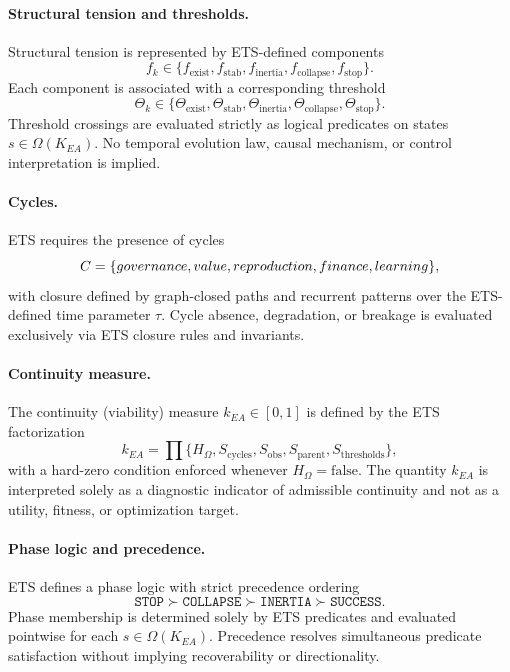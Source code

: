 \paragraph{Structural tension and thresholds.}
Structural tension is represented by ETS-defined components
\[
f_k \in \{f_{\text{exist}}, f_{\text{stab}}, f_{\text{inertia}},
          f_{\text{collapse}}, f_{\text{stop}}\}.
\]
Each component is associated with a corresponding threshold
\[
\Theta_k \in \{\Theta_{\text{exist}}, \Theta_{\text{stab}},
               \Theta_{\text{inertia}}, \Theta_{\text{collapse}},
               \Theta_{\text{stop}}\}.
\]
Threshold crossings are evaluated strictly as logical predicates on states
$s \in \Omega(K_{EA})$. No temporal evolution law, causal mechanism, or control
interpretation is implied.

\paragraph{Cycles.}
ETS requires the presence of cycles
\[
C = \{governance, value, reproduction,
      finance, learning\},
\]
with closure defined by graph-closed paths and recurrent patterns over the
ETS-defined time parameter $\tau$. Cycle absence, degradation, or breakage is
evaluated exclusively via ETS closure rules and invariants.

\paragraph{Continuity measure.}
The continuity (viability) measure $k_{EA} \in [0,1]$ is defined by the ETS
factorization
\[
k_{EA}
= \prod \{ H_{\Omega}, S_{\text{cycles}}, S_{\text{obs}},
           S_{\text{parent}}, S_{\text{thresholds}} \},
\]
with a hard-zero condition enforced whenever $H_{\Omega}=\text{false}$. The
quantity $k_{EA}$ is interpreted solely as a diagnostic indicator of admissible
continuity and not as a utility, fitness, or optimization target.

\paragraph{Phase logic and precedence.}
ETS defines a phase logic with strict precedence ordering
\[
\texttt{STOP} \succ \texttt{COLLAPSE} \succ
\texttt{INERTIA} \succ \texttt{SUCCESS}.
\]
Phase membership is determined solely by ETS predicates and evaluated pointwise
for each $s \in \Omega(K_{EA})$. Precedence resolves simultaneous predicate
satisfaction without implying recoverability or directionality.

